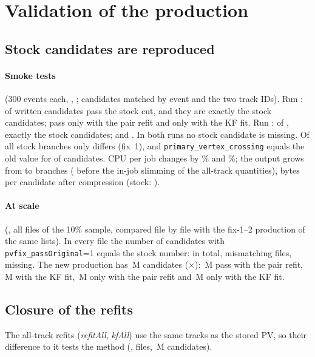 \section{Validation of the production}
\label{sec:validation}

\subsection{Stock candidates are reproduced}
\paragraph{Smoke tests} (300 events each, , ; candidates matched
by event and the two track IDs). Run \smRunA: \smPOA{} of \smNA{} written candidates pass the stock cut, and they are
exactly the \smStockA{} stock candidates; \smOnlyRA{} pass only with the pair refit and \smOnlyKA{} only with the KF fit.
Run \smRunB: \smPOB{} of \smNB{}, exactly the \smStockB{} stock candidates; \smOnlyRB{} and \smOnlyKB{}. In both runs no
stock candidate is missing. Of all stock branches only \texttt{\valDiffName} differs (fix~1), and
\texttt{primary\_vertex\_crossing} equals the old value for \valCrossEq{} of \valCommon{} candidates. CPU per job changes
by \smCpuA\% and \smCpuB\%; the output grows from \smBrStock{} to \smBrSlim{} branches (\smBrFull{} before the in-job
slimming of the all-track quantities), \smBytesCand{} bytes per candidate after compression (stock: \smBytesStock).

\paragraph{At scale} (, all \repFiles{} files of the 10\% sample, compared file by file
with the fix-1--2 production of the same lists). In every file the number of candidates with
\texttt{pvfix\_passOriginal}=1 equals the stock number: \repNoneExact{} in total, \repMismatch{} mismatching files,
\repMissing{} missing. The new production has \repNtwo\,M candidates (\repRatio$\times$): \repPR\,M pass with the pair
refit, \repPK\,M with the KF fit, \repOnlyR\,M only with the pair refit and \repOnlyK\,M only with the KF fit.

\subsection{Closure of the refits}
The all-track refits (\emph{refitAll}, \emph{kfAll}) use the same tracks as the stored PV, so their difference to it
tests the method (, \psFiles{} files, \psN\,M candidates).

